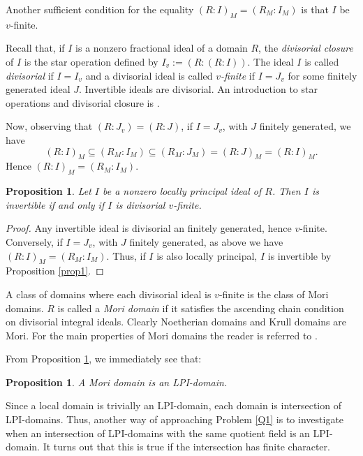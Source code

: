 \documentclass[12pt]{amsart}
\newtheorem{proposition}[theorem]{Proposition}
\theoremstyle{definition}
\begin{document}
Another sufficient condition for the equality  $(R:I)_M=(R_M:I_M)$ is that $I$ be $v$-finite. 

Recall that, if $I$ is a nonzero fractional ideal of a domain $R$, the \emph{divisorial closure} of $I$ is  the star operation defined by $I_v:=(R:(R:I))$. The ideal $I$ is called \emph{divisorial} if $I=I_v$ and a divisorial ideal is called \emph{$v$-finite} if $I=J_v$ for some finitely generated ideal $J$. Invertible ideals are divisorial. An introduction to star operations and divisorial closure is  \cite[Section 44]{gilmer}.

Now, observing that $(R:J_v)=(R:J)$, if $I=J_v$, with $J$ finitely generated, we have 
$$(R:I)_M {\subseteq} (R_M:I_M) {\subseteq} (R_M:J_M)=(R:J)_M=(R:I)_M.$$
Hence $(R:I)_M = (R_M:I_M)$.

\begin{proposition} \cite[Theorem 2.1]{A} \label{And1} Let $I$ be a nonzero  locally principal ideal of $R$.  Then $I$ is invertible if and only if $I$ is divisorial $v$-finite.
\end{proposition} 
\begin{proof} Any invertible ideal is divisorial  an finitely generated, hence $v$-finite. Conversely, if $I=J_v$, with $J$ finitely generated, as above we have $(R:I)_M = (R_M:I_M)$. Thus, if $I$ is also locally principal, $I$ is invertible by Proposition \ref{prop1}.
\end{proof}

A class of domains where each divisorial ideal is $v$-finite is the class of Mori domains.
 $R$ is called a \emph{Mori domain} if it satisfies the ascending chain condition on divisorial integral ideals. Clearly Noetherian domains and Krull domains are Mori. For the main properties of Mori domains the reader is referred to \cite{Bar}. 

From Proposition \ref{And1}, we immediately see that:

\begin{proposition} A Mori domain is an LPI-domain.
\end{proposition}

Since a local domain is trivially an LPI-domain,  each domain is intersection of LPI-domains. Thus, another way of approaching Problem \ref{Q1} is to investigate when an intersection of LPI-domains with the same quotient field  is an LPI-domain. It turns out that this is true if the intersection has finite character. 
\end{document}
